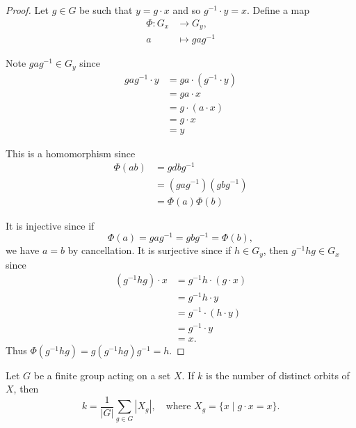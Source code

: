 \begin{proof}
	Let $g\in G$ be such that $y=g\cdot x$ and so $g^{-1}\cdot y=x$. Define a map
	\begin{align*}
		\Phi\colon G_x&\to G_y,\\
		a&\mapsto gag^{-1}
	\end{align*}

	Note $gag^{-1}\in G_y$ since
	\begin{align*}
		gag^{-1}\cdot y&=ga\cdot (g^{-1}\cdot y)\\
		&=ga\cdot x\\
		&=g\cdot (a\cdot x)\\
		&=g\cdot x\\
		&=y
	\end{align*}

	This is a homomorphism since
	\begin{align*}
		\Phi(ab)&=gdbg^{-1}\\
		&=(gag^{-1})(gbg^{-1})\\
		&=\Phi(a)\Phi(b)
	\end{align*}

	It is injective since if
	$$\Phi(a)=gag^{-1}=gbg^{-1}=\Phi(b),$$
	we have $a=b$ by cancellation. It is surjective since if $h\in G_y$, then $g^{-1}hg\in G_x$ since
	\begin{align*}
		(g^{-1}hg)\cdot x&=g^{-1}h\cdot (g\cdot x)\\
		&=g^{-1}h\cdot y\\
		&=g^{-1}\cdot (h\cdot y)\\
		&=g^{-1}\cdot y\\
		&=x.
	\end{align*}
	Thus $\Phi(g^{-1}hg)=g(g^{-1}hg)g^{-1}=h$.
\end{proof}

\begin{theorem}[Burnside]
	Let $G$ be a finite group acting on a set $X$. If $k$ is the number of distinct orbits of $X$, then
	$$k=\frac{1}{|G|}\sum_{g\in G}|X_g|,\quad\text{where }X_g=\{x\mid g\cdot x=x\}.$$
\end{theorem}

